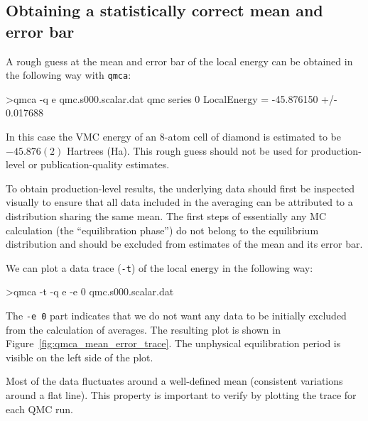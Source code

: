 \subsection{Obtaining a statistically correct mean and error bar}
\label{sec:qmca_mean_error}
A rough guess at the mean and error bar of the local energy can be 
obtained in the following way with \texttt{qmca}:
\begin{shade}
>qmca -q e qmc.s000.scalar.dat 
qmc  series 0  LocalEnergy           =  -45.876150 +/- 0.017688 
\end{shade}
\noindent
In this case the VMC energy of an 8-atom cell of diamond is estimated 
to be $-45.876(2)$ Hartrees (Ha).  This rough guess should not be used 
for production-level or publication-quality estimates.

To obtain production-level results, the underlying data should first be 
inspected visually to ensure that all data included in the averaging 
can be attributed to a distribution sharing the same mean.  The first 
steps of essentially any MC calculation (the ``equilibration 
phase'') do not belong to the equilibrium distribution and should be 
excluded from estimates of the mean and its error bar.

We can plot a data trace (\texttt{-t}) of the local energy in the 
following way:
\begin{shade}
>qmca -t -q e -e 0 qmc.s000.scalar.dat
\end{shade}
\noindent
The \texttt{-e 0} part indicates that we do not want any data 
to be initially excluded from the calculation of averages.  The resulting 
plot is shown in Figure~\ref{fig:qmca_mean_error_trace}.  The unphysical 
equilibration period is visible on the left side of the plot.

Most of the data fluctuates around a well-defined mean (consistent 
variations around a flat line).  This property is important to verify  
by plotting the trace for each QMC run. 

